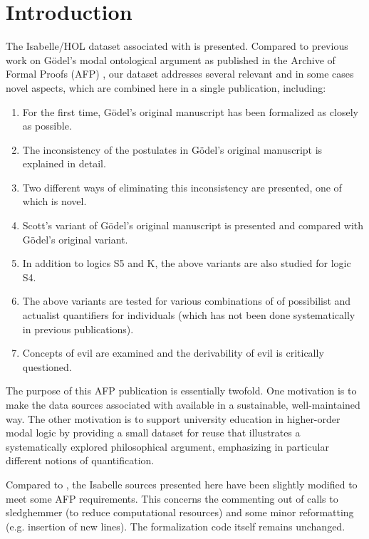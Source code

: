 \documentclass[11pt,a4paper]{article}
\begin{document}
\section{Introduction}
The Isabelle/HOL dataset associated with 
\cite{J75} is presented. Compared to previous work on G\"odel's modal
ontological argument as published in the Archive of Formal
Proofs (AFP) \cite{SimplifiedOntologicalArgument-AFP,Types_Tableaus_and_Goedels_God-AFP,GoedelGod-AFP},
our dataset addresses several relevant and in some cases
novel aspects, which are combined here in a single publication,
including:
\begin{enumerate}
  \item For the first time, G\"odel's original manuscript
    \cite{GoedelNotes} has been formalized as closely as possible.
   \item The inconsistency of the postulates in G\"odel's original manuscript is explained in detail.
   \item Two different ways of eliminating this inconsistency are presented, one of which is novel.
   \item Scott's variant \cite{ScottNotes} of G\"odel's original
     manuscript is presented and compared with G\"odel's original
     variant.
  \item In addition to logics S5 and K, the above
    variants are also studied for logic S4.
  \item The above variants are tested for various combinations of
    of possibilist and actualist quantifiers for individuals (which has not been done systematically in previous publications).
  \item Concepts of evil are examined and the derivability of evil is critically questioned.
\end{enumerate}  
The purpose of this AFP publication is essentially twofold. One
motivation is to make the data sources associated with \cite{J75}
available in a sustainable, well-maintained way. The other motivation is to support
university education in higher-order modal logic by 
providing a small dataset for reuse that illustrates a systematically explored
philosophical argument, emphasizing in particular 
different notions of quantification.

Compared to \cite{J75}, the Isabelle sources presented here have been slightly modified to meet some AFP requirements. This concerns the commenting out of calls to sledghemmer (to reduce computational resources) and 
some minor reformatting (e.g. insertion of new lines). The formalization code itself remains unchanged.





\end{document}
